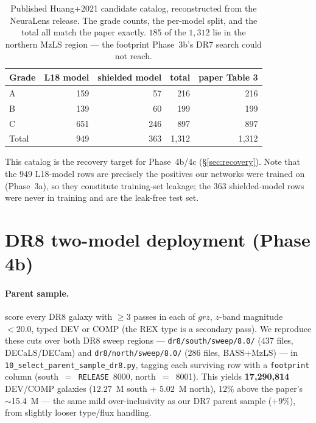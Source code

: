 \documentclass[11pt,letterpaper]{article}
\begin{document}
\begin{table}[ht]
\centering
\begin{tabular}{l r r r r}
\toprule
Grade & L18 model & shielded model & total & paper Table 3 \\
\midrule
A   & 159 & 57  & 216 & 216 \\
B   & 139 & 60  & 199 & 199 \\
C   & 651 & 246 & 897 & 897 \\
\midrule
Total & 949 & 363 & 1{,}312 & 1{,}312 \\
\bottomrule
\end{tabular}
\caption{Published Huang+2021 candidate catalog, reconstructed from the
NeuraLens release. The grade counts, the per-model split, and the total all
match the paper exactly. $185$ of the $1{,}312$ lie in the northern MzLS region
--- the footprint Phase~3b's DR7 search could not reach.}
\label{tab:catalog}
\end{table}

This catalog is the recovery target for Phase~4b/4c (\S\ref{sec:recovery}). Note
that the $949$ L18-model rows are precisely the positives our networks were
trained on (Phase~3a), so they constitute training-set leakage; the $363$
shielded-model rows were never in training and are the leak-free test set.

\section{DR8 two-model deployment (Phase 4b)}
\label{sec:deploy}

\paragraph{Parent sample.} \textcite{huang2021desi} score every DR8 galaxy with
$\ge3$ passes in each of $grz$, $z$-band magnitude $<20.0$, typed DEV or COMP
(the REX type is a secondary pass). We reproduce these cuts over both DR8 sweep
regions --- \texttt{dr8/south/sweep/8.0/} ($437$ files, DECaLS/DECam) and
\texttt{dr8/north/sweep/8.0/} ($286$ files, BASS+MzLS) --- in
\texttt{10\_select\_parent\_sample\_dr8.py}, tagging each surviving row with a
\texttt{footprint} column (south~$=$~\texttt{RELEASE}~8000, north~$=$~8001).
This yields \textbf{17{,}290{,}814} DEV/COMP galaxies ($12.27$~M south $+$ $5.02$~M
north), $12\%$ above the paper's $\sim$15.4~M --- the same mild over-inclusivity
as our DR7 parent sample ($+9\%$), from slightly looser type/flux handling.
\end{document}
